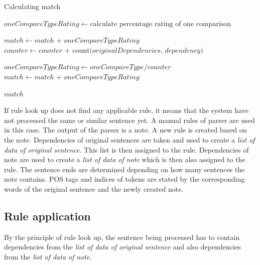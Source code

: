 \documentclass{iitsrc}
\begin{document}
		\begin{algorithm}
			\caption{Calculating match}\label{alg:calculating_match}
			\begin{algorithmic}[1]
				\State $oneCompareTypeRating \gets \text{calculate percentage rating of one comparison}$
				
						\State $match \gets match \text{ + } oneCompareTypeRating$
					\EndIf
					\State $counter \gets counter \text{ + } \text{count(}originalDependencies\text{, } dependency\text{)}$
				\EndFor
				
				\State $oneCompareTypeRating \gets oneCompareType / counter$
								\State $match \gets match \text{ + } oneCompareTypeRating$
							\EndIf
						\EndFor
					\EndFor
				\EndFor
				
				\Return $match$
				\EndProcedure
			\end{algorithmic}
		\end{algorithm}
	
		If rule look up does not find any applicable rule, it means that the system have not processed the same or similar sentence yet. A manual rules of parser are used in this case. The output of the parser is a note. A new rule is created based on the note. Dependencies of original sentences are taken and used to create a \textit{list of data of original sentence}. This list is then assigned to the rule. Dependencies of note are used to create a \textit{list of data of note} which is then also assigned to the rule. The sentence ends are determined depending on how many sentences the note contains. POS tags and indices of tokens are stated by the corresponding words of the original sentence and the newly created note.
		
	\subsection{Rule application}	\label{rule_application}
		By the principle of rule look up, the sentence being processed has to contain dependencies from the \textit{list of data of original sentence} and also dependencies from the \textit{list of data of note}.
	
\end{document}
